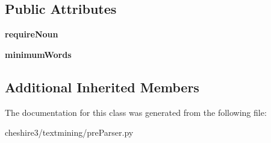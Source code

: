 \subsection*{Public Attributes}
\begin{DoxyCompactItemize}
\item 
\hypertarget{classcheshire3_1_1textmining_1_1pre_parser_1_1_genia_verb_span_pre_parser_ac526c9c3a76ef6870e0cf7943b2c20e5}{{\bfseries require\-Noun}}\label{classcheshire3_1_1textmining_1_1pre_parser_1_1_genia_verb_span_pre_parser_ac526c9c3a76ef6870e0cf7943b2c20e5}

\item 
\hypertarget{classcheshire3_1_1textmining_1_1pre_parser_1_1_genia_verb_span_pre_parser_a29e9b6e807ba14e988f1208afc7eb4c3}{{\bfseries minimum\-Words}}\label{classcheshire3_1_1textmining_1_1pre_parser_1_1_genia_verb_span_pre_parser_a29e9b6e807ba14e988f1208afc7eb4c3}

\end{DoxyCompactItemize}
\subsection*{Additional Inherited Members}


The documentation for this class was generated from the following file\-:\begin{DoxyCompactItemize}
\item 
cheshire3/textmining/pre\-Parser.\-py\end{DoxyCompactItemize}
